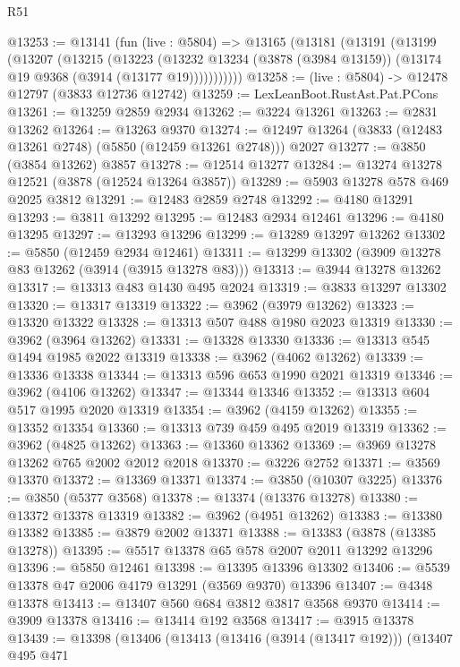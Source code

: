 \begin{lexlean}{R51}
\begin{coremodule}
@13253 := @13141
    (fun (live : @5804) =>
    @13165
      (@13181
        (@13191
          (@13199
            (@13207
              (@13215
                (@13223
                  (@13232
                    @13234
                    (@3878 (@3984 @13159))
                    (@13174 @19 @9368 (@3914 (@13177 @19)))))))))))
@13258 := (live : @5804) -> @12478 @12797 (@3833 @12736 @12742)
@13259 := LexLeanBoot.RustAst.Pat.PCons
@13261 := @13259 @2859 @2934
@13262 := @3224 @13261
@13263 := @2831 @13262
@13264 := @13263 @9370
@13274 := @12497 @13264 (@3833 (@12483 @13261 @2748) (@5850 (@12459 @13261 @2748))) @2027
@13277 := @3850 (@3854 @13262) @3857
@13278 := @12514 @13277
@13284 := @13274 @13278 @12521 (@3878 (@12524 @13264 @3857))
@13289 := @5903 @13278 @578 @469 @2025 @3812
@13291 := @12483 @2859 @2748
@13292 := @4180 @13291
@13293 := @3811 @13292
@13295 := @12483 @2934 @12461
@13296 := @4180 @13295
@13297 := @13293 @13296
@13299 := @13289 @13297 @13262
@13302 := @5850 (@12459 @2934 @12461)
@13311 := @13299 @13302 (@3909 @13278 @83 @13262 (@3914 (@3915 @13278 @83)))
@13313 := @3944 @13278 @13262
@13317 := @13313 @483 @1430 @495 @2024
@13319 := @3833 @13297 @13302
@13320 := @13317 @13319
@13322 := @3962 (@3979 @13262)
@13323 := @13320 @13322
@13328 := @13313 @507 @488 @1980 @2023 @13319
@13330 := @3962 (@3964 @13262)
@13331 := @13328 @13330
@13336 := @13313 @545 @1494 @1985 @2022 @13319
@13338 := @3962 (@4062 @13262)
@13339 := @13336 @13338
@13344 := @13313 @596 @653 @1990 @2021 @13319
@13346 := @3962 (@4106 @13262)
@13347 := @13344 @13346
@13352 := @13313 @604 @517 @1995 @2020 @13319
@13354 := @3962 (@4159 @13262)
@13355 := @13352 @13354
@13360 := @13313 @739 @459 @495 @2019 @13319
@13362 := @3962 (@4825 @13262)
@13363 := @13360 @13362
@13369 := @3969 @13278 @13262 @765 @2002 @2012 @2018
@13370 := @3226 @2752
@13371 := @3569 @13370
@13372 := @13369 @13371
@13374 := @3850 (@10307 @3225)
@13376 := @3850 (@5377 @3568)
@13378 := @13374 (@13376 @13278)
@13380 := @13372 @13378 @13319
@13382 := @3962 (@4951 @13262)
@13383 := @13380 @13382
@13385 := @3879 @2002 @13371
@13388 := @13383 (@3878 (@13385 @13278))
@13395 := @5517 @13378 @65 @578 @2007 @2011 @13292 @13296
@13396 := @5850 @12461
@13398 := @13395 @13396 @13302
@13406 := @5539 @13378 @47 @2006 @4179 @13291 (@3569 @9370) @13396
@13407 := @4348 @13378
@13413 := @13407 @560 @684 @3812 @3817 @3568 @9370
@13414 := @3909 @13378
@13416 := @13414 @192 @3568
@13417 := @3915 @13378
@13439 := @13398
    (@13406
      (@13413
        (@13416 (@3914 (@13417 @192)))
        (@13407
          @495
          @471

\end{coremodule}
\end{lexlean}
